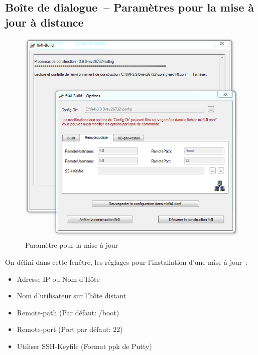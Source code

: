  \subsection{Boîte de dialogue~-- Paramètres pour la mise à jour à distance}
  \begin{figure}[h!]
  \centering
  \includegraphics[width=\columnwidth]{win_build_remoteupdate}
  \caption{Paramètre pour la mise à jour}
  \label{fig:win_build_remoteupdate}
  \end{figure}

  On défini dans cette fenêtre, les réglages pour l'installation d'une mise à jour~:
  \begin{itemize}
    \item Adresse IP ou Nom d'Hôte
    \item Nom d'utilisateur sur l'hôte distant
    \item Remote-path (Par défaut: /boot)
    \item Remote-port (Port par défaut: 22)
    \item Utiliser SSH-Keyfile (Format ppk de Putty)
  \end{itemize}

